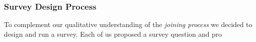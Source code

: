 \subsubsection{Survey Design Process}
To complement our qualitative understanding of the {\it joining process} we decided to design and run a survey. Each of us proposed a survey question and pro


